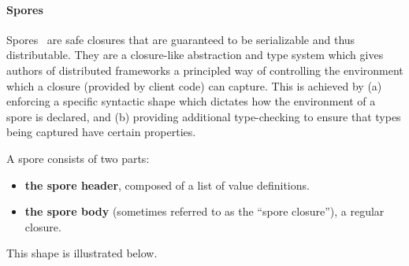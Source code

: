 \documentclass[preprint]{sigplanconf}
\theoremstyle{definition}
\theoremstyle{definition}
\begin{document}
\paragraph{Spores}

Spores~\cite{Spores} are safe closures that are guaranteed to be serializable
and thus distributable. They are a closure-like abstraction and type system
which gives authors of distributed frameworks a principled way of controlling
the environment which a closure (provided by client code) can capture. This is
achieved by (a) enforcing a specific syntactic shape which dictates how the
environment of a spore is declared, and (b) providing additional type-checking
to ensure that types being captured have certain properties.


\vspace{3mm}
\noindent A spore consists of two parts:

\begin{itemize}[noitemsep]
\item {\bf the spore header}, composed of a list of value definitions.
\item {\bf the spore body} (sometimes referred to as the “spore closure”), a
  regular closure.
\end{itemize}

\noindent This shape is illustrated below.
\end{document}
